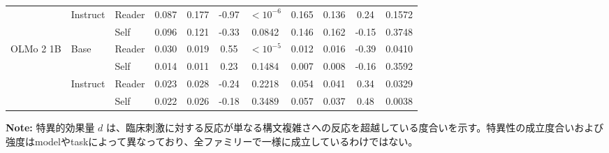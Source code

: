 \begin{table}[htbp]
\begin{tabular}{lll cccc cccc}
\cmidrule(lr){2-11}
                       & \multirow{2}{*}{Instruct} & Reader     & 0.087 & 0.177 & -0.97 & $<10^{-6}$ & 0.165 & 0.136 & 0.24 & 0.1572 \\
                       &                      & Self       & 0.096 & 0.121 & -0.33 & 0.0842 & 0.146 & 0.162 & -0.15 & 0.3748 \\
\midrule
\multirow{4}{*}{OLMo 2 1B} & \multirow{2}{*}{Base} & Reader     & 0.030 & 0.019 & 0.55 & $<10^{-5}$ & 0.012 & 0.016 & -0.39 & 0.0410 \\
                       &                      & Self       & 0.014 & 0.011 & 0.23 & 0.1484 & 0.007 & 0.008 & -0.16 & 0.3592 \\
\cmidrule(lr){2-11}
                       & \multirow{2}{*}{Instruct} & Reader     & 0.023 & 0.028 & -0.24 & 0.2218 & 0.054 & 0.041 & 0.34 & 0.0329 \\
                       &                      & Self       & 0.022 & 0.026 & -0.18 & 0.3489 & 0.057 & 0.037 & 0.48 & 0.0038 \\
\bottomrule
\end{tabular}
\vspace{1ex}
\begin{minipage}{\linewidth}
\footnotesize
\textbf{Note:} 特異的効果量 $d$ は、臨床刺激に対する反応が単なる構文複雑さへの反応を超越している度合いを示す。特異性の成立度合いおよび強度はmodelやtaskによって異なっており、全ファミリーで一様に成立しているわけではない。
\end{minipage}
\end{table}

